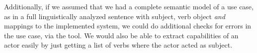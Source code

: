 \noindent Additionally, if we assumed that we had a complete semantic model of a use case, as in a full linguistically analyzed sentence with subject, verb object \emph{and} mappings to the implemented system, we could do additional checks for errors in the use case, via the tool. We would also be able to extract capabilities of an actor easily by just getting a list of verbs where the actor acted as subject.